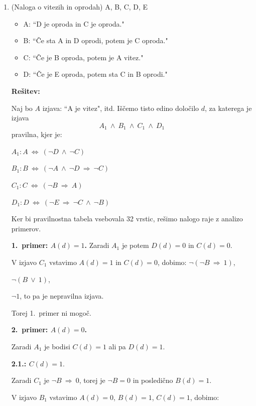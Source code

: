 \documentclass[11pt,paper=b5,footinclude,headinclude]{scrbook} %
\def\ali {{~\vee~}}
\def\inn {{~\wedge~}}
\def\sledi {{~\Rightarrow~}}
\def\cee {{~\Leftrightarrow~}}
\theoremstyle{remark}
\theoremstyle{definition} %
\theoremstyle{theorem} %
\begin{document}
\begin{enumerate}
    \item 
    (Naloga o vitezih in oprodah)
A, B, C, D, E
\begin{itemize}
  \item A: ``D je oproda in C je oproda."
  \item B: ``Če sta A in D oprodi, potem je C oproda."
  \item C: ``Če je B oproda, potem je A vitez."
  \item D: ``Če je E oproda, potem sta C in B oprodi."
\end{itemize}

\medskip
\textbf{Rešitev:}

Naj bo $A$ izjava: ``A je vitez", itd.
Iščemo tisto edino določilo $d$, za katerega je izjava $$A_1\inn B_1\inn C_1\inn D_1$$
pravilna, kjer je:

$A_1: A\cee (\neg D \inn \neg C)$

$B_1: B\cee (\neg A \inn \neg D\sledi \neg C)$

$C_1: C\cee (\neg B \sledi A)$

$D_1: D\cee (\neg E \sledi \neg C \inn \neg B)$


Ker bi pravilnostna tabela vsebovala 32 vrstic, rešimo nalogo
raje z analizo primerov.

\textbf{1.~primer: $A(d) = 1$.}
Zaradi $A_1$ je potem $D(d) = 0$ in $C(d) = 0$.

V izjavo $C_1$ vstavimo $A(d) = 1$ in $C(d) = 0$, dobimo:
$\neg(\neg B\sledi 1)$,

$\neg(B\ali 1)$,

$\neg 1$, to pa je nepravilna izjava.

Torej 1.~primer ni mogoč.
%
%
%
%
%
%

\textbf{2.~primer: $A(d) = 0$.}

Zaradi $A_1$ je bodisi $C(d) = 1$ ali pa $D(d) = 1$.

\textbf{2.1.: $C(d) = 1$}.

Zaradi $C_1$ je $\neg B \sledi 0$, torej je $\neg B = 0$ in posledično $B(d) = 1$.

V izjavo $B_1$ vstavimo $A(d) = 0$, $B(d) = 1$, $C(d) = 1$, dobimo:


\end{enumerate}
\end{document}
